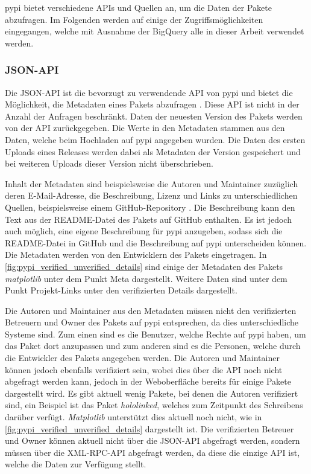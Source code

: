 \gls{pypi} bietet verschiedene APIs und Quellen an, um die Daten der Pakete abzufragen.
Im Folgenden werden auf einige der Zugriffsmöglichkeiten eingegangen, welche mit Ausnahme der BigQuery alle in dieser Arbeit verwendet werden.

\subsubsection*{JSON-API}
\label{subsubsec:pypi_json_api}
Die JSON-API ist die bevorzugt zu verwendende API von \gls{pypi} und bietet die Möglichkeit, die Metadaten eines Pakets abzufragen \autocite{python_software_foundation_warehouse_2024}.
Diese API ist nicht in der Anzahl der Anfragen beschränkt.
Daten der neuesten Version des Pakets werden von der API zurückgegeben.
Die Werte in den Metadaten stammen aus den Daten, welche beim Hochladen auf \gls{pypi} angegeben wurden.
Die Daten des ersten Uploads eines Releases werden dabei als Metadaten der Version gespeichert und bei weiteren Uploads dieser Version nicht überschrieben.

Inhalt der Metadaten sind beispielsweise die Autoren und Maintainer zuzüglich deren E-Mail-Adresse, die Beschreibung, Lizenz und Links zu unterschiedlichen Quellen, beispielsweise einem GitHub-Repository \autocite{python_software_foundation_warehouse_2024}.
Die Beschreibung kann den Text aus der README-Datei des Pakets auf GitHub enthalten.
Es ist jedoch auch möglich, eine eigene Beschreibung für \gls{pypi} anzugeben, sodass sich die README-Datei in GitHub und die Beschreibung auf \gls{pypi} unterscheiden können.
Die Metadaten werden von den Entwicklern des Pakets eingetragen.
In \autoref{fig:pypi_verified_unverified_details} sind einige der Metadaten des Pakets \emph{matplotlib} unter dem Punkt \glqq Meta\grqq{} dargestellt.
Weitere Daten sind unter dem Punkt \glqq Projekt-Links\grqq{} unter den verifizierten Details dargestellt.

Die Autoren und Maintainer aus den Metadaten müssen nicht den verifizierten Betreuern und Owner des Pakets auf \gls{pypi} entsprechen, da dies unterschiedliche Systeme sind.
Zum einen sind es die Benutzer, welche Rechte auf \gls{pypi} haben, um das Paket dort anzupassen und zum anderen sind es die Personen, welche durch die Entwickler des Pakets angegeben werden.
Die Autoren und Maintainer können jedoch ebenfalls verifiziert sein, wobei dies über die API noch nicht abgefragt werden kann, jedoch in der Weboberfläche bereits für einige Pakete dargestellt wird.
Es gibt aktuell wenig Pakete, bei denen die Autoren verifiziert sind, ein Beispiel ist das Paket \emph{hololinked}, welches zum Zeitpunkt des Schreibens darüber verfügt.
\emph{Matplotlib} unterstützt dies aktuell noch nicht, wie in \autoref{fig:pypi_verified_unverified_details} dargestellt ist.
Die verifizierten Betreuer und Owner können aktuell nicht über die JSON-API abgefragt werden, sondern müssen über die XML-RPC-API abgefragt werden, da diese die einzige API ist, welche die Daten zur Verfügung stellt.

